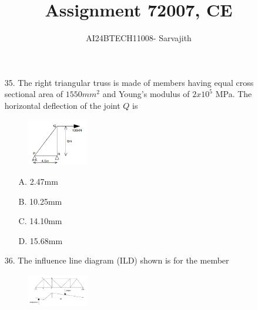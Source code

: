 \documentclass[journal]{IEEEtran}
\begin{document}

\vspace{3cm}


\author{AI24BTECH11008- Sarvajith
}
\title{Assignment 7}
{\let\newpage\relax\maketitle}
\title{2007, CE}
\renewcommand{\thefigure}{\theenumi}
\renewcommand{\thetable}{\theenumi}
\setlength{\intextsep}{10pt} %
\renewcommand{\thetable}{\theenumi}
\begin{enumerate}
  \item[35.]The right triangular truss is made of members having equal cross sectional area of
  $1550 mm^2$ and Young's modulus of $2 x 10^5$ MPa. The horizontal deflection of the
  joint $Q$ is 
  \begin{figure}[h!]
    \centering
    \includegraphics[width=0.25\textwidth]{figs/Fig_1.png}  %
    \label{fig:sample1}
\end{figure}
  \begin{enumerate}
    \item [A.] 2.47mm
    \item [B.] 10.25mm
    \item [C.] 14.10mm
    \item [D.] 15.68mm
  \end{enumerate}
  \item[36.] The influence line diagram (ILD) shown is for the member
  \item[]  \begin{figure}[h!]
    \centering
    \includegraphics[width=0.25\textwidth]{figs/Fig_2.png}  %
    \label{fig:sample2}
\end{figure}

\end{enumerate}
\end{document}
